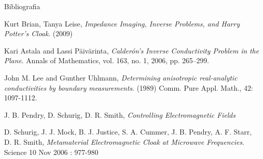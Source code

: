 \documentclass{beamer}
\newcommand{\1}{\mathbbm{1}}
\begin{document}
\begin{frame}{Bibliografia}
%


\begin{thebibliography}{99} 
 Kurt Brian, Tanya Leise, \textit{Impedance Imaging, Inverse Problems, and Harry Potter's Cloak}. (2009)

 Kari Astala and Lassi Päivärinta, \textit{Calderón's Inverse Conductivity Problem in the Plane}. Annals of Mathematics, vol. 163, no. 1, 2006, pp. 265–299.

 John M. Lee and Gunther Uhlmann, \textit{Determining anisotropic real‐analytic conductivities by boundary measurements}. (1989) Comm. Pure Appl. Math., 42: 1097-1112.

 J. B. Pendry, D. Schurig, D. R. Smith, \textit{Controlling Electromagnetic Fields}

 D. Schurig, J. J. Mock, B. J. Justice, S. A. Cummer, J. B. Pendry, A. F. Starr, D. R. Smith, \textit{Metamaterial Electromagnetic Cloak at Microwave Frequencies}. Science 10 Nov 2006 : 977-980

\end{thebibliography}
\end{frame}
\end{document}
